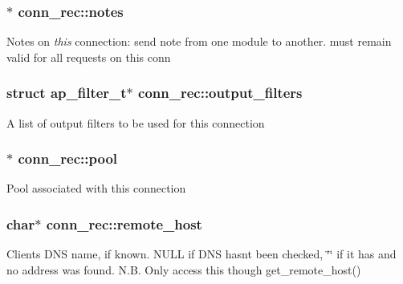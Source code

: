 \subsubsection[{\texorpdfstring{notes}{notes}}]{$\ast$ conn\+\_\+rec\+::notes}\hypertarget{structconn__rec_a7ca7fb2d3bb81f91764bc960686a4fcf}{}\label{structconn__rec_a7ca7fb2d3bb81f91764bc960686a4fcf}
Notes on {\itshape this} connection\+: send note from one module to another. must remain valid for all requests on this conn 
\subsubsection[{\texorpdfstring{output\+\_\+filters}{output_filters}}]{\setlength{\rightskip}{0pt plus 5cm}struct {\bf ap\+\_\+filter\+\_\+t}$\ast$ conn\+\_\+rec\+::output\+\_\+filters}\hypertarget{structconn__rec_a41ce808290656ac63a859b7145b0602c}{}\label{structconn__rec_a41ce808290656ac63a859b7145b0602c}
A list of output filters to be used for this connection 
\subsubsection[{\texorpdfstring{pool}{pool}}]{$\ast$ conn\+\_\+rec\+::pool}\hypertarget{structconn__rec_a1dc5f31c7afc4a6f9c4ede0daea8cd1d}{}\label{structconn__rec_a1dc5f31c7afc4a6f9c4ede0daea8cd1d}
Pool associated with this connection 
\subsubsection[{\texorpdfstring{remote\+\_\+host}{remote_host}}]{\setlength{\rightskip}{0pt plus 5cm}char$\ast$ conn\+\_\+rec\+::remote\+\_\+host}\hypertarget{structconn__rec_ac42b1d296a58fc8053c3bacb26cc2e25}{}\label{structconn__rec_ac42b1d296a58fc8053c3bacb26cc2e25}
Client\textquotesingle{}s D\+NS name, if known. N\+U\+LL if D\+NS hasn\textquotesingle{}t been checked, \char`\"{}\char`\"{} if it has and no address was found. N.\+B. Only access this though get\+\_\+remote\+\_\+host() 
